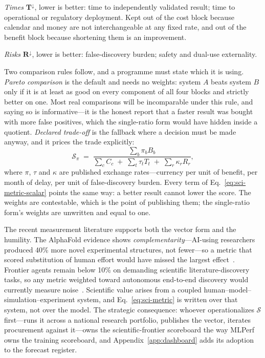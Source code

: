 \emph{Times} $\mathbf{T}^{\downarrow}$, lower is better: time to independently validated result; time to operational or regulatory deployment. Kept out of the cost block because calendar and money are not interchangeable at any fixed rate, and out of the benefit block because shortening them is an improvement.

\emph{Risks} $\mathbf{R}^{\downarrow}$, lower is better: false-discovery burden; safety and dual-use externality.

Two comparison rules follow, and a programme must state which it is using. \emph{Pareto comparison} is the default and needs no weights: system $A$ beats system $B$ only if it is at least as good on every component of all four blocks and strictly better on one. Most real comparisons will be incomparable under this rule, and saying so is informative---it is the honest report that a faster result was bought with more false positives, which the single-ratio form would have hidden inside a quotient. \emph{Declared trade-off} is the fallback where a decision must be made anyway, and it prices the trade explicitly:
\begin{equation}
\mathcal{S}_{\pi} \;=\; \frac{\sum_b \pi_b B_b}{\sum_c C_c \;+\; \sum_t \tau_t T_t \;+\; \sum_r \kappa_r R_r},
\label{eq:sci-metric-scalar}
\end{equation}
where $\pi$, $\tau$ and $\kappa$ are published exchange rates---currency per unit of benefit, per month of delay, per unit of false-discovery burden. Every term of Eq.~\eqref{eq:sci-metric-scalar} points the same way: a better result cannot lower the score. The weights are contestable, which is the point of publishing them; the single-ratio form's weights are unwritten and equal to one.

The recent measurement literature supports both the vector form and the humility. The AlphaFold evidence shows \emph{complementarity}---AI-using researchers produced 40\% more novel experimental structures, not fewer---so a metric that scored substitution of human effort would have missed the largest effect~\cite{hill2026,alphafold-impact}. Frontier agents remain below 10\% on demanding scientific literature-discovery tasks, so any metric weighted toward autonomous end-to-end discovery would currently measure noise~\cite{xiong2026}. Scientific value arises from a coupled human--model--simulation--experiment system, and Eq.~\eqref{eq:sci-metric} is written over that system, not over the model. The strategic consequence: whoever operationalizes $\boldsymbol{\mathcal{S}}$ first---runs it across a national research portfolio, publishes the vector, iterates procurement against it---owns the scientific-frontier scoreboard the way MLPerf owns the training scoreboard, and Appendix~\ref{app:dashboard} adds its adoption to the forecast register.

